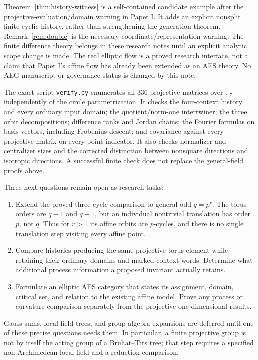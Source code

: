 \documentclass[11pt]{article}
\theoremstyle{definition}
\theoremstyle{remark}
\newcommand{\F}{\mathbb F}
\begin{document}
Theorem~\ref{thm:history-witness} is a self-contained candidate example after
the projective-evaluation/domain warning in Paper I. It adds an explicit
nonsplit finite cyclic history, rather than strengthening the generation
theorem. Remark~\ref{rem:double} is the necessary coordinate/representation
warning. The finite difference theory belongs in these research notes until
an explicit analytic scope change is made. The real elliptic flow is a proved
research interface, not a claim that Paper I's affine flow has already been
extended as an AES theory. No AEG manuscript or governance status is changed
by this note.

The exact script \texttt{verify.py} enumerates all $336$ projective matrices
over $\F_7$ independently of the circle parametrization. It checks the
four-context history and every ordinary input domain; the quotient/norm-one
intertwiner; the three orbit decompositions; difference ranks and Jordan
chains; the Fourier formulas on basis vectors, including Frobenius descent;
and covariance against every projective matrix on every point indicator.
It also checks normalizer and centralizer sizes and the corrected distinction
between nonsquare directions and isotropic directions. A successful finite
check does not replace the general-field proofs above.

Three next questions remain open as research tasks:
\begin{enumerate}
\item Extend the proved three-cycle comparison to general odd $q=p^r$.
The torus orders are $q-1$ and $q+1$, but an individual nontrivial translation
has order $p$, not $q$. Thus for $r>1$ its affine orbits are $p$-cycles, and
there is no single translation step visiting every affine point.
\item Compare histories producing the same projective torus element while
retaining their ordinary domains and marked context words. Determine what
additional process information a proposed invariant actually retains.
\item Formulate an elliptic AES category that states its assignment, domain,
critical set, and relation to the existing affine model. Prove any process or
curvature comparison separately from the projective one-dimensional results.
\end{enumerate}
Gauss sums, local-field trees, and group-algebra expansions are deferred until
one of these precise questions needs them. In particular, a finite projective
group is not by itself the acting group of a Bruhat--Tits tree; that step
requires a specified non-Archimedean local field and a reduction comparison.
\end{document}
